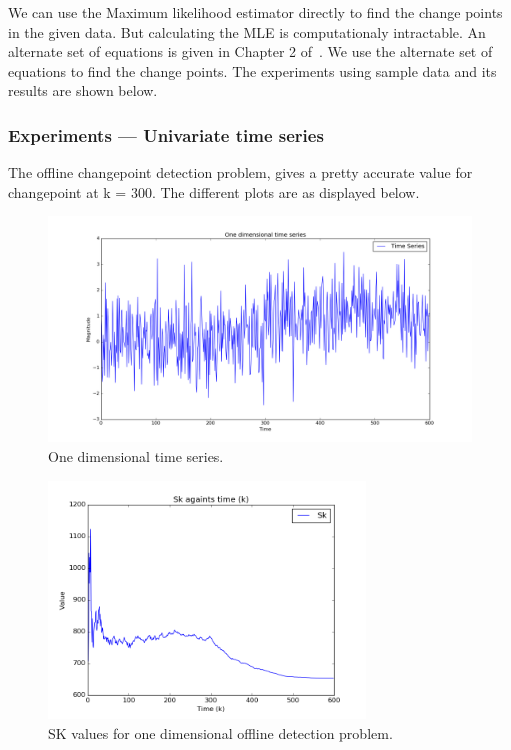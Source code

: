 \documentclass{article}
\begin{document}
We can use the Maximum likelihood estimator directly to find the change points in the given data.  But calculating the MLE is computationaly intractable.  
An alternate set of equations is given in Chapter 2 of~\cite{birkhauser_pscpa}.  We use the alternate set of equations to find the change points.  The experiments using sample data and its results are shown below.

\subsubsection{Experiments --- Univariate time series}
The offline changepoint detection problem, gives a pretty accurate value for changepoint at k = 300.  The different plots are as displayed below.

\begin{figure}[ht!]
  \centering
  \includegraphics[width=1\textwidth]{images/1d_offline/ts}
  \caption{One dimensional time series.\label{fig:1d_ts}}
\end{figure}

\begin{figure}[ht!]
  \centering
  \includegraphics[width=0.75\textwidth]{images/1d_offline/sk}
  \caption{SK values for one dimensional offline detection problem.\label{fig:1d_sk}}
\end{figure}
\end{document}
